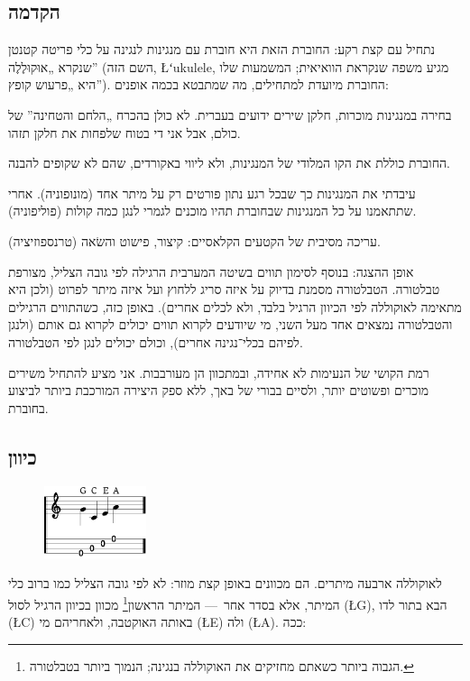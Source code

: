 \subsection*{הקדמה}

נתחיל עם קצת רקע: החוברת הזאת היא חוברת עם מנגינות לנגינה על כלי פריטה קטנטן שנקרא „אוּקוּלֶלֶה” (השם הזה, \L{{ʻ}ukulele}, מגיע משפה שנקראת הוואיאית; המשמעות שלו היא „פרעוש קופץ”). החוברת מיועדת למתחילים, מה שמתבטא בכמה אופנים:
\begin{compactitem}
	\item בחירה במנגינות מוכרות, חלקן שירים ידועים בעברית. לא כולן בהכרח „הלחם והטחינה” של כולם, אבל אני די בטוח שלפחות את חלקן תזהו.
	\item החוברת כוללת את הקו המלודי של המנגינות, ולא ליווי באקורדים, שהם לא שקופים להבנה.
	\item עיבדתי את המנגינות כך שבכל רגע נתון פורטים רק על מיתר אחד (מונופוניה). אחרי שתתאמנו על כל המנגינות שבחוברת תהיו מוכנים לגמרי לנגן כמה קולות (פוליפוניה).
	\item עריכה מסיבית של הקטעים הקלאסיים: קיצור, פישוט והשׂאה (טרנספוזיציה).
	\item אופן ההצגה: בנוסף לסימון תווים בשיטה המערבית הרגילה לפי גובה הצליל, מצורפת טבלטורה. הטבלטורה מסמנת בדיוק על איזה סריג ללחוץ ועל איזה מיתר לפרוט (ולכן היא מתאימה לאוקוללה לפי הכיוון הרגיל בלבד, ולא לכלים אחרים). באופן כזה, כשהתווים הרגילים והטבלטורה נמצאים אחד מעל השני, מי שיודעים לקרוא תווים יכולים לקרוא גם אותם (ולנגן לפיהם בכלי־נגינה אחרים), וכולם יכולים לנגן לפי הטבלטורה.
\end{compactitem}
רמת הקושי של הנעימות לא אחידה, ובמתכוון הן מעורבבות. אני מציע להתחיל משירים מוכרים ופשוטים יותר, ולסיים בבורי של באך, ללא ספק היצירה המורכבת ביותר לביצוע בחוברת.



\subsection*{כיוון}

\begin{figure}\vspace{-\baselineskip}\includegraphics[width=3cm]{agordo.eps}\end{figure}
לאוקוללה ארבעה מיתרים. הם מכוונים באופן קצת מוזר: לא לפי גובה הצליל כמו ברוב כלי המיתר, אלא בסדר אחר~— המיתר הראשון\footnote{הגבוה ביותר כשאתם מחזיקים את האוקוללה בנגינה; הנמוך ביותר בטבלטורה.} מכוון בכיוון הרגיל לסול (\L{G}), הבא בתור לדו (\L{C}) באותה האוקטבה, ולאחריהם מי (\L{E}) ולה (\L{A}). ככה:

